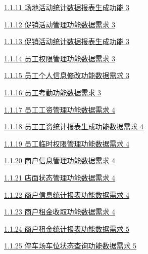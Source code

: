 \documentclass[]{article}
\begin{document}
\protect\hyperlink{ux573aux5730ux6d3bux52a8ux7edfux8ba1ux6570ux636eux62a5ux8868ux751fux6210ux529fux80fd}{1.1.11
场地活动统计数据报表生成功能 3}

\protect\hyperlink{ux4fc3ux9500ux6d3bux52a8ux7ba1ux7406ux529fux80fdux6570ux636eux9700ux6c42}{1.1.12
促销活动管理功能数据需求 3}

\protect\hyperlink{ux4fc3ux9500ux6d3bux52a8ux7edfux8ba1ux6570ux636eux62a5ux8868ux751fux6210ux529fux80fd}{1.1.13
促销活动统计数据报表生成功能 3}

\protect\hyperlink{ux5458ux5de5ux6743ux9650ux7ba1ux7406ux529fux80fdux6570ux636eux9700ux6c42}{1.1.14
员工权限管理功能数据需求 3}

\protect\hyperlink{ux5458ux5de5ux4e2aux4ebaux4fe1ux606fux4feeux6539ux529fux80fdux6570ux636eux9700ux6c42}{1.1.15
员工个人信息修改功能数据需求 3}

\protect\hyperlink{ux5458ux5de5ux8003ux52e4ux529fux80fdux6570ux636eux9700ux6c42}{1.1.16
员工考勤功能数据需求 3}

\protect\hyperlink{ux5458ux5de5ux5de5ux8d44ux7ba1ux7406ux529fux80fdux6570ux636eux9700ux6c42}{1.1.17
员工工资管理功能数据需求 4}

\protect\hyperlink{ux5458ux5de5ux5de5ux8d44ux7edfux8ba1ux62a5ux8868ux751fux6210ux529fux80fdux6570ux636eux9700ux6c42}{1.1.18
员工工资统计报表生成功能数据需求 4}

\protect\hyperlink{ux5458ux5de5ux4e34ux65f6ux6743ux9650ux7ba1ux7406ux529fux80fdux6570ux636eux9700ux6c42}{1.1.19
员工临时权限管理功能数据需求 4}

\protect\hyperlink{ux5546ux6237ux4fe1ux606fux7ba1ux7406ux529fux80fdux6570ux636eux9700ux6c42}{1.1.20
商户信息管理功能数据需求 4}

\protect\hyperlink{ux5e97ux9762ux72b6ux6001ux7ba1ux7406ux529fux80fdux6570ux636eux9700ux6c42}{1.1.21
店面状态管理功能数据需求 4}

\protect\hyperlink{ux5546ux6237ux4fe1ux606fux7edfux8ba1ux62a5ux8868ux529fux80fdux6570ux636eux9700ux6c42}{1.1.22
商户信息统计报表功能数据需求 4}

\protect\hyperlink{ux5546ux6237ux79dfux91d1ux6536ux53d6ux529fux80fdux6570ux636eux9700ux6c42}{1.1.23
商户租金收取功能数据需求 4}

\protect\hyperlink{ux5546ux6237ux79dfux91d1ux7edfux8ba1ux62a5ux8868ux529fux80fdux6570ux636eux9700ux6c42}{1.1.24
商户租金统计报表功能数据需求 5}

\protect\hyperlink{ux505cux8f66ux573aux8f66ux4f4dux72b6ux6001ux67e5ux8be2ux529fux80fdux6570ux636eux9700ux6c42}{1.1.25
停车场车位状态查询功能数据需求 5}
\end{document}
